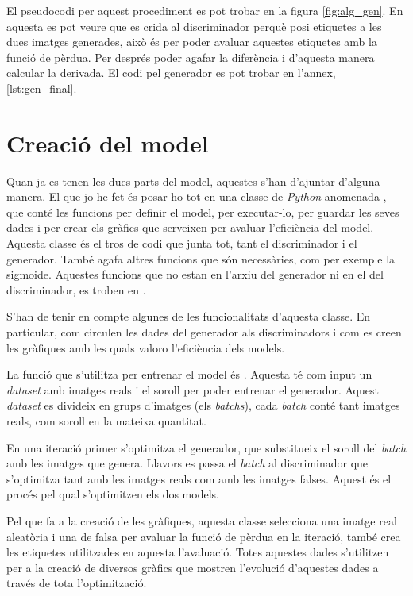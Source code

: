 El pseudocodi per aquest procediment es pot trobar en la figura \ref{fig:alg_gen}. En aquesta es pot veure que es crida al discriminador perquè posi etiquetes a les dues imatges generades, això és per poder avaluar aquestes etiquetes amb la funció de pèrdua. Per després poder agafar la diferència i d'aquesta manera calcular la derivada. El codi pel generador es pot trobar en l'annex, \ref{lst:gen_final}.

\section{Creació del model}

Quan ja es tenen les dues parts del model, aquestes s'han d'ajuntar d'alguna manera. El que jo he fet és posar-ho tot en una classe de \textit{Python} anomenada , que conté les funcions per definir el model, per executar-lo, per guardar les seves dades i per crear els gràfics que serveixen per avaluar l'eficiència del model. Aquesta classe és el tros de codi que junta tot, tant el discriminador i el generador. També agafa altres funcions que són necessàries, com per exemple la sigmoide. Aquestes funcions que no estan en l'arxiu del generador ni en el del discriminador, es troben en .

S'han de tenir en compte algunes de les funcionalitats d'aquesta classe. En particular, com circulen les dades del generador als discriminadors i com es creen les gràfiques amb les quals valoro l'eficiència dels models.

La funció que s'utilitza per entrenar el model és . Aquesta té com input un \textit{dataset} amb imatges reals i el soroll per poder entrenar el generador. Aquest \textit{dataset} es divideix en grups d'imatges (els \textit{batchs}), cada \textit{batch} conté tant imatges reals, com soroll en la mateixa quantitat.

En una iteració primer s'optimitza el generador, que substitueix el soroll del \textit{batch} amb les imatges que genera. Llavors es passa el \textit{batch} al discriminador que s'optimitza tant amb les imatges reals com amb les imatges falses. Aquest és el procés pel qual s'optimitzen els dos models. 

Pel que fa a la creació de les gràfiques, aquesta classe selecciona una imatge real aleatòria i una de falsa per avaluar la funció de pèrdua en la iteració, també crea les etiquetes utilitzades en aquesta l'avaluació. Totes aquestes dades s'utilitzen per a la creació de diversos gràfics que mostren l'evolució d'aquestes dades a través de tota l'optimització.

